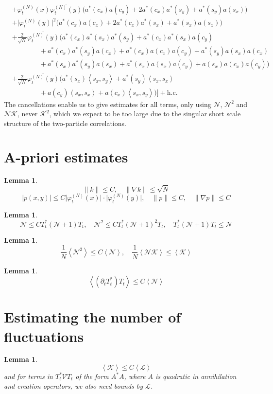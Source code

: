 \documentclass[11pt,a4paper,twoside,headsepline]{scrartcl}
\newtheorem{lem}[thm]{Lemma}
\newcommand{\Lcal}{\mathcal{L}}		%
\newcommand{\Ncal}{\mathcal{N}}		%
\newcommand{\Kcal}{\mathcal{K}}		%
\newcommand{\Vcal}{\mathcal{V}}		%
\newcommand{\hc}{\mbox{h.c.}}		%
\newcommand{\scal}[2]{\left<#1,#2\right>} %
\newcommand{\cc}[1]{\overline{#1}}	%
\newcommand{\norm}[1]{\lVert#1\rVert}	%
\newcommand{\ev}[1]{\left<#1\right>}	%
\newcommand{\ph}{\varphi_t^{(N)}}	%
\newcommand{\bd}{\begin{displaymath}}			%
\newcommand{\ed}{\end{displaymath}}
\begin{document}
\begin{align*}
& + \ph(x) \cc{\ph(y)} \Big( a^*(c_x) a(c_y) + 2 a^*(c_x) a^*(s_y) + a^*(s_y) a(s_x) \Big) \\
& + \lvert \ph(y) \rvert^2 \Big( a^*(c_x) a(c_x) + 2 a^*(c_x) a^*(s_x) + a^*(s_x) a(s_x) \Big) \\
& + \frac{2}{\sqrt{N}}\cc{\ph(y)} \bigg(    a^*(c_x) a^*(s_x) a^*(s_y) + a^*(c_x) a^*(s_x) a(c_y) \\
					    & \qquad\qquad + a^*(c_x) a^*(s_y) a(c_x) + a^*(c_x) a(c_x) a(c_y) + a^*(s_y) a(s_x) a(c_x)\\
					    & \qquad\qquad + a^*(s_x) a^*(s_y) a(s_x) + a^*(s_x) a(s_x) a(c_y) + a(s_x) a(c_x) a(c_y)  \bigg) \\
& + \frac{2}{\sqrt{N}}\cc{\ph(y)} \bigg(    a^*(s_x) \scal{s_x}{s_y} + a^*(s_y) \scal{s_x}{s_x} \\
					    & \qquad\qquad + a(c_y) \scal{s_x}{s_x} + a(c_x) \scal{s_x}{s_y}   \bigg)    \Big] + \hc
\end{align*}
The cancellations enable us to give estimates for all terms, only using $\Ncal$, $\Ncal^2$ and $\Ncal \Kcal$, never $\Kcal^2$, which we expect to be too large due to the singular short scale structure of the two-particle correlations.

\section{A-priori estimates}
\begin{lem}
 \bd
  \norm{k} \leq C, \quad \norm{\nabla k} \leq \sqrt{N}
 \ed
 \bd
  \lvert p(x,y) \rvert \leq C \lvert \ph(x) \rvert\cdot \lvert \ph(y) \rvert, \quad \norm{p} \leq C, \quad \norm{\nabla p} \leq C
 \ed
\end{lem}

\begin{lem}
\bd
\Ncal \leq C T^*_t (\Ncal + 1) T_t, \quad \Ncal^2 \leq C T^*_t (\Ncal + 1)^2 T_t, \quad T^*_t (\Ncal + 1) T_t \leq \Ncal
\ed
\end{lem}


\begin{lem}
\label{lem:nsquaredbound}
 \bd
 \frac{1}{N}\ev{\Ncal^2} \leq C \ev{\Ncal}, \quad \frac{1}{N}\ev{\Ncal \Kcal} \leq \ev{\Kcal}
 \ed
\end{lem}

\begin{lem}
 \bd
  \ev{(\partial_t T^*_t)T_t} \leq C \ev{\Ncal}
 \ed
\end{lem}


\section{Estimating the number of fluctuations}
\begin{lem}
\label{lem:kvbounds}
 \bd
\ev{\Kcal} \leq  C \ev{\Lcal}
\ed
and for terms in $T^*_t \Vcal T_t$ of the form $A^* A$, where $A$ is quadratic in annihilation and creation operators, we also need bounds by $\Lcal$.
\end{lem}
\end{document}

